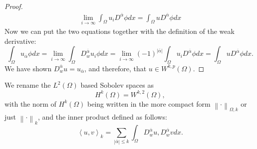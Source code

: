 \documentclass[../Main/main.tex]{subfiles}
\begin{document}
\begin{proof}
\begin{gather*}
			\lim_{i\rightarrow \infty}\int_{\Omega} u_i D^{\overline{\alpha}}\phi dx = \int_{\Omega} u  D^{\overline{\alpha}}\phi dx
		\end{gather*}
		Now we can put the two equations together with the definition of the weak derivative:
		\begin{equation*}
			\int_{\Omega}u_{\overline{\alpha}} \phi dx = \lim_{i\rightarrow \infty} \int_{\Omega} D_w^{\overline{\alpha}}u_i \phi dx = \lim_{i\rightarrow \infty}(-1)^{|\overline{\alpha}|}\int_{\Omega} u_i D^{\overline{\alpha}}\phi dx = \int_{\Omega} u  D^{\overline{\alpha}}\phi dx.
		\end{equation*}
		We have shown $D_w^{\overline{\alpha}}u =  u_{\overline{\alpha}}$, and therefore, that $u\in W^{k,p}(\Omega)$. 
	\end{proof}
	\begin{definition}
		We rename the $L^2(\Omega)$ based Sobolev spaces as 
		\begin{equation*}
			H^k(\Omega) = W^{k,2}(\Omega),
		\end{equation*}
		with the norm of $H^k(\Omega)$ being written in the more compact form $\left \| \cdot \right \|_{\Omega,k}$ or just $\left \| \cdot \right \|_{k}$, and the inner product defined as follows:
		\begin{equation*}
			\left \langle u,v \right \rangle_k = \sum_{|\overline{\alpha}| \leq k} \int_{\Omega}D_w^{\overline{\alpha}}u,D_w^{\overline{\alpha}}v dx.
		\end{equation*}
	\end{definition}
\end{document}
